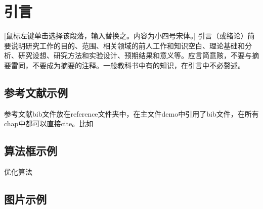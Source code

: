 		
		\chapter{引言}
		
	 [鼠标左键单击选择该段落，输入替换之。内容为小四号宋体。] 引言（或绪论）简要说明研究工作的目的、范围、相关领域的前人工作和知识空白、理论基础和分析、研究设想、研究方法和实验设计、预期结果和意义等。应言简意赅，不要与摘要雷同，不要成为摘要的注释。一般教科书中有的知识，在引言中不必赘述。
	 
	 \section{参考文献示例}
	 参考文献bib文件放在reference文件夹中，在主文件demo中引用了bib文件，在所有chap中都可以直接cite。比如\cite{silver2016mastering}
	 
	 \section{算法框示例}
	 
	 \begin{algorithm}[h]
	 	\caption{ 优化算法}
	 	\label{gtdmc:alg:minmax}			
	 	
	 	
	 	
	 	
	 \end{algorithm}	 
 
 \section{图片示例}
 
 
 
 			\begin{figure}[h]
 	\centering
 	
 	
 	\label{Fig1}	
 	\label{fig1}
 \end{figure}	
 